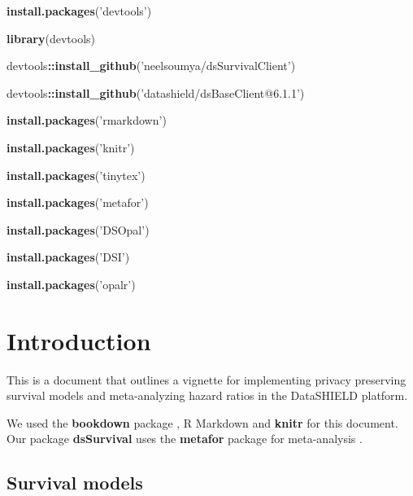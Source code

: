 \documentclass[
]{book}
\newenvironment{Shaded}{\begin{snugshade}}{\end{snugshade}}
\newcommand{\KeywordTok}[1]{\textcolor[rgb]{0.13,0.29,0.53}{\textbf{#1}}}
\newcommand{\NormalTok}[1]{#1}
\newcommand{\OperatorTok}[1]{\textcolor[rgb]{0.81,0.36,0.00}{\textbf{#1}}}
\newcommand{\StringTok}[1]{\textcolor[rgb]{0.31,0.60,0.02}{#1}}
\begin{document}
\begin{Shaded}
\begin{Highlighting}[]
\KeywordTok{install.packages}\NormalTok{(}\StringTok{'devtools'}\NormalTok{)}

\KeywordTok{library}\NormalTok{(devtools)}

\NormalTok{devtools}\OperatorTok{::}\KeywordTok{install_github}\NormalTok{(}\StringTok{'neelsoumya/dsSurvivalClient'}\NormalTok{)}

\NormalTok{devtools}\OperatorTok{::}\KeywordTok{install_github}\NormalTok{(}\StringTok{'datashield/dsBaseClient@6.1.1'}\NormalTok{)}

\KeywordTok{install.packages}\NormalTok{(}\StringTok{'rmarkdown'}\NormalTok{)}

\KeywordTok{install.packages}\NormalTok{(}\StringTok{'knitr'}\NormalTok{)}

\KeywordTok{install.packages}\NormalTok{(}\StringTok{'tinytex'}\NormalTok{)}

\KeywordTok{install.packages}\NormalTok{(}\StringTok{'metafor'}\NormalTok{)}

\KeywordTok{install.packages}\NormalTok{(}\StringTok{'DSOpal'}\NormalTok{)}

\KeywordTok{install.packages}\NormalTok{(}\StringTok{'DSI'}\NormalTok{)}

\KeywordTok{install.packages}\NormalTok{(}\StringTok{'opalr'}\NormalTok{)}
\end{Highlighting}
\end{Shaded}

\hypertarget{intro}{%
\chapter{Introduction}\label{intro}}

This is a document that outlines a vignette for implementing privacy preserving survival models
and meta-analyzing hazard ratios in the DataSHIELD platform.

We used the \textbf{bookdown} package \citep{R-bookdown}, R Markdown and \textbf{knitr} \citep{xie2015} for this document. Our package \textbf{dsSurvival} \citep{Banerjeef}\citep{soumya_banerjee_2021_4917552}\citep{Banerjee2022} uses the \textbf{metafor} package for meta-analysis \citep{Viechtbauer2010}.

\hypertarget{survival-models}{%
\section{Survival models}\label{survival-models}}
\end{document}
